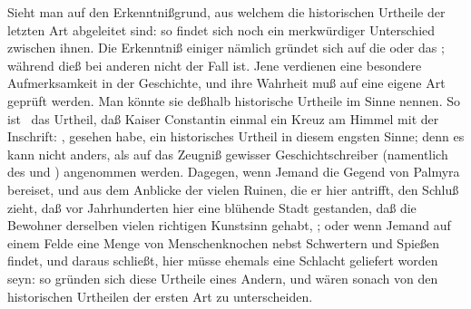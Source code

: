 \begin{aufza}
\item Sieht man auf den Erkenntnißgrund, aus welchem die historischen Urtheile der letzten Art abgeleitet sind: so findet sich noch ein merkwürdiger Unterschied zwischen ihnen. Die Erkenntniß einiger nämlich gründet sich auf die  oder das ; während dieß bei anderen nicht der Fall ist. Jene verdienen eine besondere Aufmerksamkeit in der Geschichte, und ihre Wahrheit muß auf eine eigene Art geprüft werden. Man könnte sie deßhalb historische Urtheile im  Sinne nennen. So ist \zB\ das Urtheil, daß Kaiser Constantin einmal ein Kreuz am Himmel mit der Inschrift: , gesehen habe, ein historisches Urtheil in diesem engsten Sinne; denn es kann nicht anders, als auf das Zeugniß gewisser Geschichtschreiber (namentlich des  und ) angenommen werden. Dagegen, wenn Jemand die Gegend von Palmyra bereiset, und aus dem Anblicke der vielen Ruinen, die er hier antrifft, den Schluß zieht, daß vor Jahrhunderten hier eine blühende Stadt gestanden, daß die Bewohner derselben vielen richtigen Kunstsinn gehabt, \usw ; oder wenn Jemand auf einem Felde eine Menge von Menschenknochen nebst Schwertern und Spießen findet, und daraus schließt, hier müsse ehemals eine Schlacht geliefert worden seyn: so gründen sich diese Urtheile  eines Andern, und wären sonach von den historischen Urtheilen der ersten Art zu unterscheiden.
\end{aufza}

